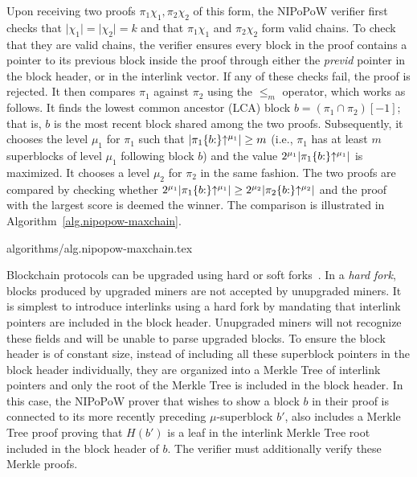 Upon receiving two proofs $\pi_1\chi_1, \pi_2\chi_2$ of this form, the NIPoPoW verifier
first checks that $\lvert \chi_1 \rvert = \lvert \chi_2 \rvert = k$ and that
$\pi_1 \chi_1$ and $\pi_2 \chi_2$ form valid chains. To check that they are
valid chains, the verifier ensures every block in the
proof contains a pointer to its previous block inside the proof through either
the \emph{previd} pointer in the block header, or in the interlink vector. If
any of these checks fail, the proof is rejected. It then
compares $\pi_1$ against $\pi_2$ using
the $\leq_m$ operator, which works as follows. It finds the
lowest common ancestor (LCA) block $b = (\pi_1 \cap \pi_2)[-1]$; that is, $b$ is the
most recent block shared among the two proofs. Subsequently, it
chooses the level $\mu_1$ for $\pi_1$ such that
$\lvert \pi_1\{b{:}\}\negthickspace\uparrow^{\mu_1} \rvert \geq m$
(i.e., $\pi_1$ has at least $m$ superblocks of level $\mu_1$ following block
$b$) and the value
$2^{\mu_1} \lvert \pi_1\{b{:}\}\negthickspace\uparrow^{\mu_1} \rvert$
is maximized.
It chooses a level $\mu_2$ for $\pi_2$ in the same fashion. The two proofs are
compared
by checking whether
$2^{\mu_1} \lvert \pi_1\{b{:}\}\negthickspace\uparrow^{\mu_1} \rvert \geq
 2^{\mu_2} \lvert \pi_2\{b{:}\}\negthickspace\uparrow^{\mu_2} \rvert$
and the proof with the largest score is deemed the winner. The comparison is
illustrated in Algorithm~\ref{alg.nipopow-maxchain}.

{algorithms/alg.nipopow-maxchain.tex}

Blockchain protocols can be upgraded using hard or soft
forks~\cite{buterinforks}. In a \emph{hard fork}, blocks produced by
upgraded miners are not accepted by unupgraded miners. It is simplest to
introduce interlinks using a hard fork by mandating that interlink pointers are
included in the block header. Unupgraded miners will not
recognize these fields and will be unable to parse upgraded blocks.
To ensure the block header is of constant size, instead of including all these
superblock pointers in the block header individually, they are organized into a
Merkle Tree of interlink pointers and only the root of the Merkle Tree is
included in the block header. In this case, the NIPoPoW prover that wishes to
show a block $b$ in their proof is connected to its more recently preceding
$\mu$-superblock $b'$, also includes a Merkle Tree proof proving that $H(b')$ is
a leaf in the interlink Merkle Tree root included in the block header of $b$.
The verifier must additionally verify these Merkle proofs.

